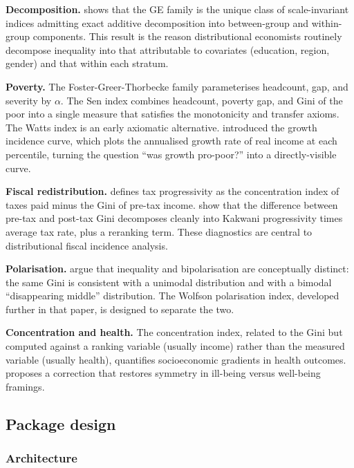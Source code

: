 \textbf{Decomposition.} \citet{bourguignon1979decomposable} shows that
the GE family is the unique class of scale-invariant indices admitting
exact additive decomposition into between-group and within-group
components. This result is the reason distributional economists
routinely decompose inequality into that attributable to covariates
(education, region, gender) and that within each stratum.

\textbf{Poverty.} The Foster-Greer-Thorbecke family
\citep{foster1984class} parameterises headcount, gap, and severity by
\(\alpha\). The Sen index \citep{sen1976poverty} combines headcount,
poverty gap, and Gini of the poor into a single measure that satisfies
the monotonicity and transfer axioms. The Watts index is an early
axiomatic alternative. \citet{ravallion2003measuring} introduced the
growth incidence curve, which plots the annualised growth rate of real
income at each percentile, turning the question ``was growth pro-poor?''
into a directly-visible curve.

\textbf{Fiscal redistribution.} \citet{kakwani1977measurement} defines
tax progressivity as the concentration index of taxes paid minus the
Gini of pre-tax income. \citet{reynolds1977public} show that the
difference between pre-tax and post-tax Gini decomposes cleanly into
Kakwani progressivity times average tax rate, plus a reranking term.
These diagnostics are central to distributional fiscal incidence
analysis.

\textbf{Polarisation.} \citet{foster2010polarization} argue that
inequality and bipolarisation are conceptually distinct: the same Gini
is consistent with a unimodal distribution and with a bimodal
``disappearing middle'' distribution. The Wolfson polarisation index,
developed further in that paper, is designed to separate the two.

\textbf{Concentration and health.} The concentration index, related to
the Gini but computed against a ranking variable (usually income) rather
than the measured variable (usually health), quantifies socioeconomic
gradients in health outcomes. \citet{erreygers2009correcting} proposes a
correction that restores symmetry in ill-being versus well-being
framings.

\subsection{Package design}\label{package-design}

\subsubsection{Architecture}\label{architecture}

